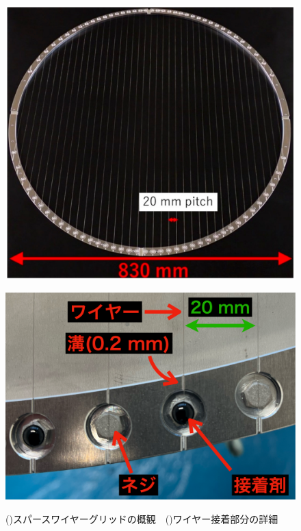 \documentclass[../../main.tex]{subfiles}
\begin{document}
\begin{figure}[H]
    \begin{minipage}[b]{0.48\columnwidth}
        \centering
        \includegraphics[width=\columnwidth]{wiregrid/wiregrid_appearance.pdf}
        \subcaption{}
        \label{fig:wiregrid_appearance}
    \end{minipage}
    \hspace{0.02\columnwidth}
    \begin{minipage}[b]{0.48\columnwidth}
        \centering
        \includegraphics[width=\columnwidth]{wiregrid/wire_detail_view.pdf}
        \subcaption{}
        \label{fig:wire_detail_view}
    \end{minipage}
    \caption{()スパースワイヤーグリッドの概観~\cite{swg:Murata_2023}\ ()ワイヤー接着部分の詳細}
    \label{fig:swg}
\end{figure}
\end{document}
